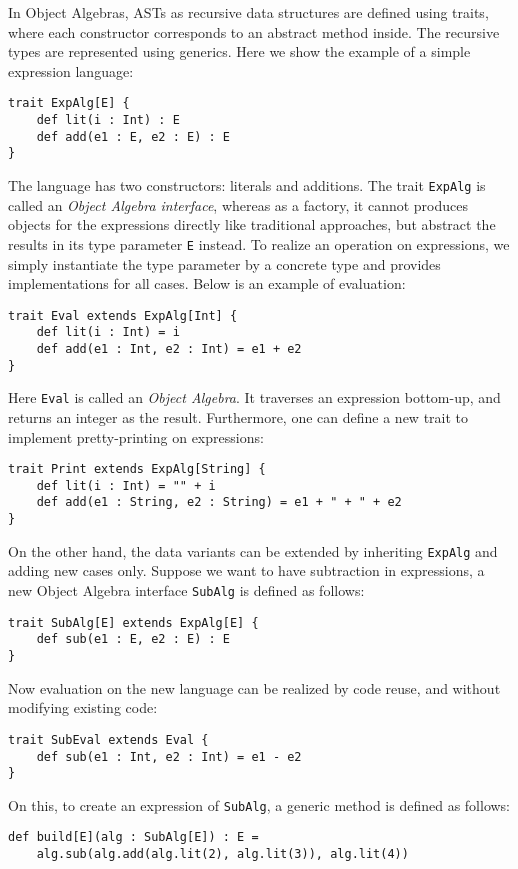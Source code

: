 In Object Algebras, ASTs as recursive data structures are defined using traits, where each constructor corresponds
to an abstract method inside. The recursive types are represented using generics. Here we show the example of a simple
expression language:
\begin{lstlisting}
trait ExpAlg[E] {
    def lit(i : Int) : E
    def add(e1 : E, e2 : E) : E
}
\end{lstlisting}
The language has two constructors: literals and additions. The trait \lstinline{ExpAlg} is called an \textit{Object Algebra interface},
whereas as a factory, it cannot produces objects for the expressions directly like traditional approaches, but abstract the results in its
type parameter \lstinline{E} instead. To realize an operation on expressions, we simply instantiate the type parameter by a concrete type and
provides implementations for all cases. Below is an example of evaluation:
\begin{lstlisting}
trait Eval extends ExpAlg[Int] {
    def lit(i : Int) = i
    def add(e1 : Int, e2 : Int) = e1 + e2
}
\end{lstlisting}
Here \lstinline{Eval} is called an \textit{Object Algebra}. It traverses an expression bottom-up, and returns an integer as the result.
Furthermore, one can define a new trait to implement pretty-printing on expressions:
\begin{lstlisting}
trait Print extends ExpAlg[String] {
    def lit(i : Int) = "" + i
    def add(e1 : String, e2 : String) = e1 + " + " + e2
}
\end{lstlisting}
On the other hand, the data variants can be extended by inheriting \lstinline{ExpAlg} and adding new cases only. Suppose we want to
have subtraction in expressions, a new Object Algebra interface \lstinline{SubAlg} is defined as follows:
\begin{lstlisting}
trait SubAlg[E] extends ExpAlg[E] {
    def sub(e1 : E, e2 : E) : E
}
\end{lstlisting}
Now evaluation on the new language can be realized by code reuse, and without modifying existing code:
\begin{lstlisting}
trait SubEval extends Eval {
    def sub(e1 : Int, e2 : Int) = e1 - e2
}
\end{lstlisting}
On this, to create an expression of \lstinline{SubAlg}, a generic method is defined as follows:
\begin{lstlisting}
def build[E](alg : SubAlg[E]) : E =
    alg.sub(alg.add(alg.lit(2), alg.lit(3)), alg.lit(4))
\end{lstlisting}
